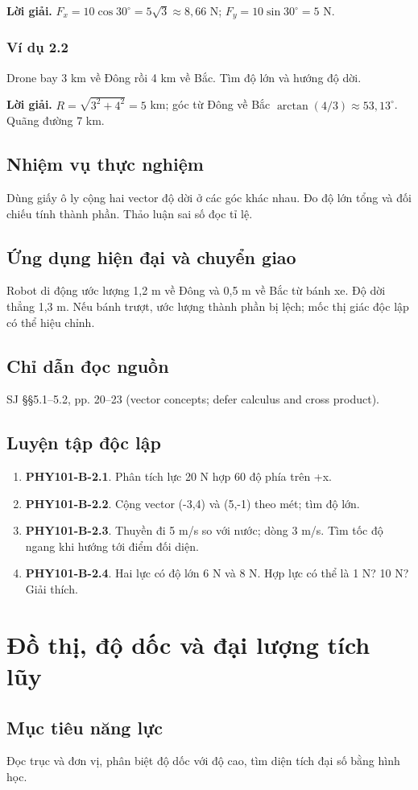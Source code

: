 \documentclass[11pt,a4paper,openany]{book}
\begin{document}
\textbf{Lời giải.} $F_x=10\cos30^\circ=5\sqrt3\approx8{,}66$ N; $F_y=10\sin30^\circ=5$ N.
\subsection*{Ví dụ 2.2}
Drone bay 3 km về Đông rồi 4 km về Bắc. Tìm độ lớn và hướng độ dời.

\textbf{Lời giải.} $R=\sqrt{3^2+4^2}=5$ km; góc từ Đông về Bắc $\arctan(4/3)\approx53{,}13^\circ$. Quãng đường 7 km.
\section{Nhiệm vụ thực nghiệm}
Dùng giấy ô ly cộng hai vector độ dời ở các góc khác nhau. Đo độ lớn tổng và đối chiếu tính thành phần. Thảo luận sai số đọc tỉ lệ.
\section{Ứng dụng hiện đại và chuyển giao}
Robot di động ước lượng 1,2 m về Đông và 0,5 m về Bắc từ bánh xe. Độ dời thẳng 1,3 m. Nếu bánh trượt, ước lượng thành phần bị lệch; mốc thị giác độc lập có thể hiệu chỉnh.
\section{Chỉ dẫn đọc nguồn}
SJ §§5.1–5.2, pp. 20–23 (vector concepts; defer calculus and cross product).
\section{Luyện tập độc lập}
\begin{enumerate}
\item \textbf{PHY101-B-2.1}. Phân tích lực 20 N hợp 60 độ phía trên +x.
\item \textbf{PHY101-B-2.2}. Cộng vector (-3,4) và (5,-1) theo mét; tìm độ lớn.
\item \textbf{PHY101-B-2.3}. Thuyền đi 5 m/s so với nước; dòng 3 m/s. Tìm tốc độ ngang khi hướng tới điểm đối diện.
\item \textbf{PHY101-B-2.4}. Hai lực có độ lớn 6 N và 8 N. Hợp lực có thể là 1 N? 10 N? Giải thích.
\end{enumerate}
\chapter{Đồ thị, độ dốc và đại lượng tích lũy}
\section{Mục tiêu năng lực}
Đọc trục và đơn vị, phân biệt độ dốc với độ cao, tìm diện tích đại số bằng hình học.
\end{document}
